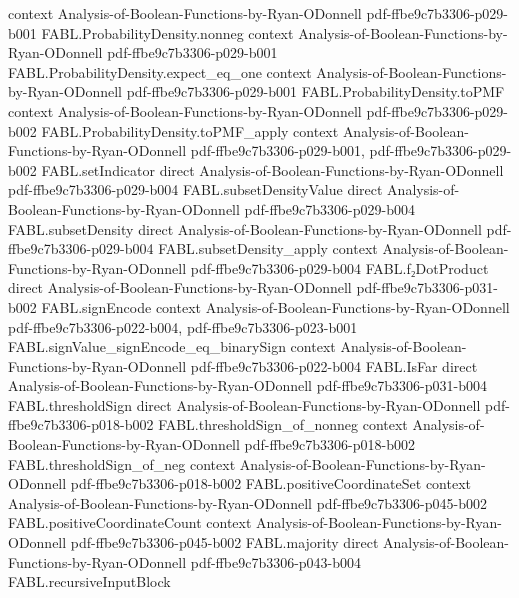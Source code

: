 \begin{theorem}
  {context}
  {Analysis-of-Boolean-Functions-by-Ryan-ODonnell}
  {pdf-ffbe9c7b3306-p029-b001}
\proofstep
  {FABL.ProbabilityDensity.nonneg}
  {context}
  {Analysis-of-Boolean-Functions-by-Ryan-ODonnell}
  {pdf-ffbe9c7b3306-p029-b001}
\proofstep
  {FABL.ProbabilityDensity.expect_eq_one}
  {context}
  {Analysis-of-Boolean-Functions-by-Ryan-ODonnell}
  {pdf-ffbe9c7b3306-p029-b001}
\proofstep
  {FABL.ProbabilityDensity.toPMF}
  {context}
  {Analysis-of-Boolean-Functions-by-Ryan-ODonnell}
  {pdf-ffbe9c7b3306-p029-b002}
\proofstep
  {FABL.ProbabilityDensity.toPMF_apply}
  {context}
  {Analysis-of-Boolean-Functions-by-Ryan-ODonnell}
  {pdf-ffbe9c7b3306-p029-b001,
    pdf-ffbe9c7b3306-p029-b002}
\proofstep
  {FABL.setIndicator}
  {direct}
  {Analysis-of-Boolean-Functions-by-Ryan-ODonnell}
  {pdf-ffbe9c7b3306-p029-b004}
\proofstep
  {FABL.subsetDensityValue}
  {direct}
  {Analysis-of-Boolean-Functions-by-Ryan-ODonnell}
  {pdf-ffbe9c7b3306-p029-b004}
\proofstep
  {FABL.subsetDensity}
  {direct}
  {Analysis-of-Boolean-Functions-by-Ryan-ODonnell}
  {pdf-ffbe9c7b3306-p029-b004}
\proofstep
  {FABL.subsetDensity_apply}
  {context}
  {Analysis-of-Boolean-Functions-by-Ryan-ODonnell}
  {pdf-ffbe9c7b3306-p029-b004}
\proofstep
  {FABL.f₂DotProduct}
  {direct}
  {Analysis-of-Boolean-Functions-by-Ryan-ODonnell}
  {pdf-ffbe9c7b3306-p031-b002}
\proofstep
  {FABL.signEncode}
  {context}
  {Analysis-of-Boolean-Functions-by-Ryan-ODonnell}
  {pdf-ffbe9c7b3306-p022-b004,
    pdf-ffbe9c7b3306-p023-b001}
\proofstep
  {FABL.signValue_signEncode_eq_binarySign}
  {context}
  {Analysis-of-Boolean-Functions-by-Ryan-ODonnell}
  {pdf-ffbe9c7b3306-p022-b004}
\proofstep
  {FABL.IsFar}
  {direct}
  {Analysis-of-Boolean-Functions-by-Ryan-ODonnell}
  {pdf-ffbe9c7b3306-p031-b004}
\proofstep
  {FABL.thresholdSign}
  {direct}
  {Analysis-of-Boolean-Functions-by-Ryan-ODonnell}
  {pdf-ffbe9c7b3306-p018-b002}
\proofstep
  {FABL.thresholdSign_of_nonneg}
  {context}
  {Analysis-of-Boolean-Functions-by-Ryan-ODonnell}
  {pdf-ffbe9c7b3306-p018-b002}
\proofstep
  {FABL.thresholdSign_of_neg}
  {context}
  {Analysis-of-Boolean-Functions-by-Ryan-ODonnell}
  {pdf-ffbe9c7b3306-p018-b002}
\proofstep
  {FABL.positiveCoordinateSet}
  {context}
  {Analysis-of-Boolean-Functions-by-Ryan-ODonnell}
  {pdf-ffbe9c7b3306-p045-b002}
\proofstep
  {FABL.positiveCoordinateCount}
  {context}
  {Analysis-of-Boolean-Functions-by-Ryan-ODonnell}
  {pdf-ffbe9c7b3306-p045-b002}
\proofstep
  {FABL.majority}
  {direct}
  {Analysis-of-Boolean-Functions-by-Ryan-ODonnell}
  {pdf-ffbe9c7b3306-p043-b004}
\proofstep
  {FABL.recursiveInputBlock}

\end{theorem}
